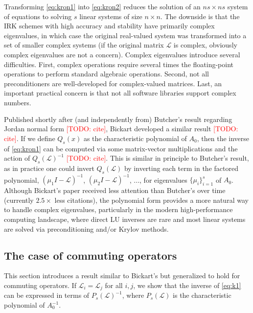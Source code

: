 \documentclass[a4paper,10pt]{article}
\makeatletter
\newcommand{\todo}[1]{\textcolor{red}{[TODO\@: #1]}}
\makeatother
\begin{document}
Transforming \eqref{eq:kron1} into \eqref{eq:kron2} reduces the solution of an $ns\times ns$
system of equations to solving $s$ linear systems of size $n\times n$. The downside is that the
IRK schemes with high accuracy and stability have primarily complex eigenvalues, in which case
the original real-valued system was transformed into a set of smaller complex systems (if the
original matrix $\mathcal{L}$ is complex, obviously complex eigenvalues are not a concern).
Complex eigenvalues introduce several difficulties. First, complex operations require several
times the floating-point operations to perform standard algebraic operations. Second, not
all preconditioners are well-developed for complex-valued matrices. Last, an important
practical concern is that not all software libraries support complex numbers. 

Published shortly after (and independently from) Butcher's result regarding Jordan normal
form \todo{cite}, Bickart developed a similar result \todo{cite}. If we define $Q_s(x)$ as the characteristic
polynomial of $A_0$, then the inverse of \eqref{eq:kron1} can be computed via some matrix-vector
multiplications and the action of $Q_s(\mathcal{L})^{-1}$ \todo{cite}. This is similar in principle to
Butcher's result, as in practice one could invert $Q_s(\mathcal{L})$ by inverting 
each term in the factored polynomial, $(\mu_1 I-\mathcal{L})^{-1}$,
$(\mu_2 I-\mathcal{L})^{-1}$, ..., for eigenvalues $\{\mu_i\}_{i=1}^s$ of $A_0$.
Although Bickart's paper received less attention than Butcher's over time (currently $2.5\times$
less citations), the polynomial form provides a more natural way to handle complex eigenvalues,
particularly in the modern high-performance computing landscape, where direct LU inverses
are rare and most linear systems are solved via preconditioning and/or Krylov methods. 

\subsection{The case of commuting operators}

This section introduces a result similar to Bickart's but generalized to hold for commuting
operators. If $\mathcal{L}_i=\mathcal{L}_j$ for all $i,j$, we show that the inverse of
\eqref{eq:k1} can be expressed in terms of $P_s(\mathcal{L})^{-1}$, where $P_s(\mathcal{L})$
is the characteristic polynomial of $A_0^{-1}$.
\end{document}
